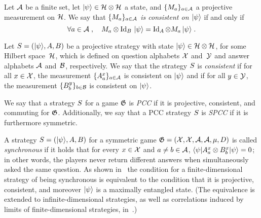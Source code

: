 \begin{definition}
  \label{def:consistent-measurement}
  Let $\cal{A}$ be a finite set, let $\ket{\psi} \in \mH \otimes \mH$ a
  state, and $\{ M_a \}_{a \in \cal{A}}$ a projective measurement on
  $\mH$.
  We say that \emph{$\{M_a\}_{a \in \cal{A}}$ is consistent on $\ket{\psi}$} if
  and only if
  \begin{equation*}
    \forall a \in \mA\;,\quad M_a \otimes \Id_\bob\, \ket{\psi}
    = \Id_\alice \otimes M_a\, \ket{\psi}\;.
  \end{equation*}
\end{definition}

\begin{definition}
  \label{def:consistent-strategy}
	Let $\strategy = (\ket{\psi}, A, B)$ be a projective strategy with state
  $\ket{\psi} \in \mH \otimes \mH$, for some Hilbert space~$\mH$, which is
  defined on question alphabets $\cal{X}$ and~$\cal{Y}$ and answer alphabets
  $\cal{A}$ and~$\cal{B}$, respectively.
  We say that the strategy $\strategy$ is \emph{consistent} if for all $x \in
  \cal{X}$, the measurement $\{A^x_a\}_{a \in \cal{A}}$ is consistent on
  $\ket{\psi}$ and if for all $y \in \cal{Y}$, the measurement $\{B^y_b\}_{b \in
    \cal{B}}$ is consistent on $\ket{\psi}$.
\end{definition}

\begin{definition}
  \label{def:spcc}
  We say that a strategy $\strategy$ for a game $\game$ is \emph{PCC} if it is projective, consistent, and commuting for $\game$.
  Additionally, we say that a PCC strategy $\strategy$ is \emph{SPCC} if it is furthermore symmetric.
\end{definition}

\begin{remark}
  A strategy $\strategy = (\ket{\psi},A,B)$ for a symmetric game $\game =
  (\cal{X}, \cal{X}, \cal{A}, \cal{A}, \mu, D)$ is called \emph{synchronous} if
  it holds that for every $x\in \cal{X}$ and $a\neq b \in \cal{A}$, $\bra{\psi}
  A^x_a \otimes B^x_b \ket{\psi} = 0$; in other words,
  the players never return different answers when simultaneously asked the same
  question.
  As shown in~\cite{paulsen2016estimating} the condition for a
  finite-dimensional strategy of being synchronous is equivalent to the
  condition that it is projective, consistent, and moreover $\ket{\psi}$ is a
  maximally entangled state.
  (The equivalence is extended to infinite-dimensional strategies, as well as
  correlations induced by limits of finite-dimensional strategies,
  in~\cite{kim2018synchronous}.)
\end{remark}

